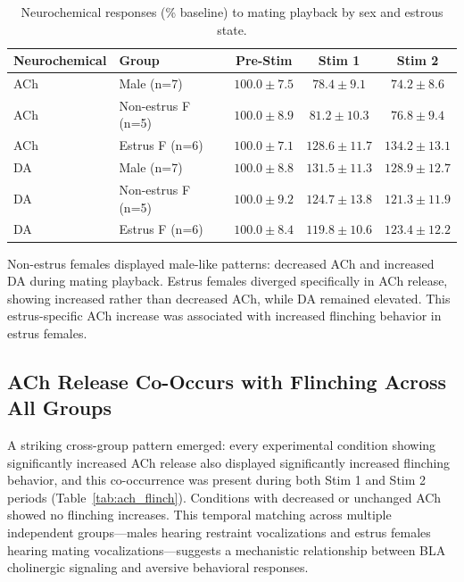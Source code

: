 \documentclass[11pt]{article}
\begin{document}
\begin{table}[H]
\centering
\caption{Neurochemical responses (\% baseline) to mating playback by sex and estrous state.}
\label{tab:sex_effects}
\begin{tabular}{llccc}
\toprule
\textbf{Neurochemical} & \textbf{Group} & \textbf{Pre-Stim} & \textbf{Stim 1} & \textbf{Stim 2} \\
\midrule
ACh & Male (n=7) & $100.0 \pm 7.5$ & $78.4 \pm 9.1$ & $74.2 \pm 8.6$ \\
ACh & Non-estrus F (n=5) & $100.0 \pm 8.9$ & $81.2 \pm 10.3$ & $76.8 \pm 9.4$ \\
ACh & Estrus F (n=6) & $100.0 \pm 7.1$ & $128.6 \pm 11.7$ & $134.2 \pm 13.1$ \\
DA & Male (n=7) & $100.0 \pm 8.8$ & $131.5 \pm 11.3$ & $128.9 \pm 12.7$ \\
DA & Non-estrus F (n=5) & $100.0 \pm 9.2$ & $124.7 \pm 13.8$ & $121.3 \pm 11.9$ \\
DA & Estrus F (n=6) & $100.0 \pm 8.4$ & $119.8 \pm 10.6$ & $123.4 \pm 12.2$ \\
\bottomrule
\end{tabular}
\end{table}

Non-estrus females displayed male-like patterns: decreased ACh and increased DA during mating playback. Estrus females diverged specifically in ACh release, showing increased rather than decreased ACh, while DA remained elevated. This estrus-specific ACh increase was associated with increased flinching behavior in estrus females.

\subsection{ACh Release Co-Occurs with Flinching Across All Groups}

A striking cross-group pattern emerged: every experimental condition showing significantly increased ACh release also displayed significantly increased flinching behavior, and this co-occurrence was present during both Stim 1 and Stim 2 periods (Table~\ref{tab:ach_flinch}). Conditions with decreased or unchanged ACh showed no flinching increases. This temporal matching across multiple independent groups---males hearing restraint vocalizations and estrus females hearing mating vocalizations---suggests a mechanistic relationship between BLA cholinergic signaling and aversive behavioral responses.
\end{document}
